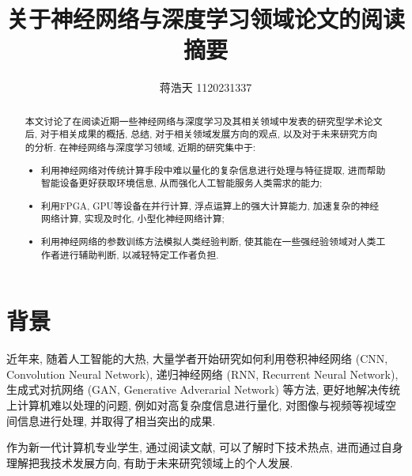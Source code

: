\documentclass[]{ctexart}
\title{关于神经网络与深度学习领域论文的阅读摘要}
\author{蒋浩天 1120231337}
\begin{document}
\maketitle

\begin{abstract}

    本文讨论了在阅读近期一些神经网络与深度学习及其相关领域中发表的研究型学术论文后, 对于相关成果的概括, 总结, 对于相关领域发展方向的观点, 以及对于未来研究方向的分析. 在神经网络与深度学习领域, 近期的研究集中于: 

\begin{itemize}

    \item 利用神经网络对传统计算手段中难以量化的复杂信息进行处理与特征提取, 进而帮助智能设备更好获取环境信息, 从而强化人工智能服务人类需求的能力; 
    \item 利用FPGA, GPU等设备在并行计算, 浮点运算上的强大计算能力, 加速复杂的神经网络计算, 实现及时化, 小型化神经网络计算;
    \item 利用神经网络的参数训练方法模拟人类经验判断, 使其能在一些强经验领域对人类工作者进行辅助判断, 以减轻特定工作者负担. 
    
\end{itemize}

\end{abstract}

\section{背景}

    近年来, 随着人工智能的大热, 大量学者开始研究如何利用卷积神经网络 (CNN, Convolution Neural Network), 递归神经网络 (RNN, Recurrent Neural Network), 生成式对抗网络 (GAN, Generative Adverarial Network) 等方法, 更好地解决传统上计算机难以处理的问题, 例如对高复杂度信息进行量化, 对图像与视频等视域空间信息进行处理, 并取得了相当突出的成果. 
    
    作为新一代计算机专业学生, 通过阅读文献, 可以了解时下技术热点, 进而通过自身理解把我技术发展方向, 有助于未来研究领域上的个人发展. 
    
\end{document}
